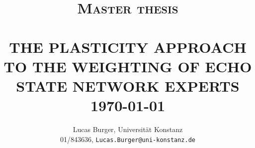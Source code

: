 

\newcommand{\rawtitle}{The Plasticity Approach to the Weighting of Echo State Network Experts}
\title{	\large \textsc{Master thesis} 	%
		 	\\[2.0cm]								%
			\HRule{0.5pt} \\						%
			\LARGE \textbf{\uppercase{\rawtitle}}	%
			\HRule{0.5pt} \\ [0.5cm]		%
			\normalsize \today			%
		}

\author{
        Lucas Burger, Universit\"at Konstanz \\
         01/843636, \texttt{Lucas.Burger@uni-konstanz.de} \\
}
